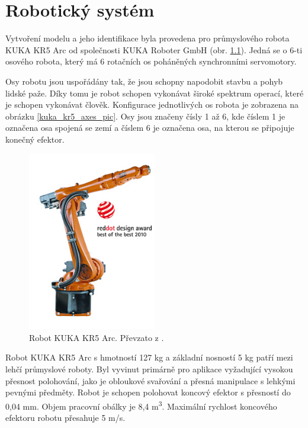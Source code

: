 
\chapter{Robotický systém}

Vytvoření modelu a jeho identifikace byla provedena pro průmyslového robota KUKA KR5 Arc \cite{kuka_datasheet_url} od společnosti KUKA Roboter GmbH (obr. \ref{kuka_kr5_pic}). Jedná se o 6-ti osového robota, který má 6 rotačních os poháněných synchronními servomotory. 

Osy robotu jsou uspořádány tak, že jsou schopny napodobit stavbu a pohyb lidské paže. Díky tomu je robot schopen vykonávat široké spektrum operací, které je schopen vykonávat člověk. Konfigurace jednotlivých os robota je zobrazena na obrázku \ref{kuka_kr5_axes_pic}. Osy jsou značeny čísly 1 až 6, kde číslem 1 je označena osa spojená se zemí a číslem 6 je označena osa, na kterou se připojuje konečný efektor. 

\begin{figure}[ht]
\includegraphics[width=0.5\textwidth]{PR_KR5_arc_02}
\caption{Robot KUKA KR5 Arc. Převzato z \cite{kuka_datasheet_url}.}
\label{kuka_kr5_pic}
\end{figure}

Robot KUKA KR5 Arc s hmotností 127 kg a základní nosností 5 kg patří mezi lehčí průmyslové roboty. Byl vyvinut primárně pro aplikace vyžadující vysokou přesnost polohování, jako je obloukové svařování a přesná manipulace s lehkými pevnými předměty. Robot je schopen polohovat koncový efektor s přesností do 0,04 mm. Objem pracovní obálky je 8,4 \si{m^{3}}. Maximální rychlost koncového efektoru robotu přesahuje 5 \si{m/s}.  

